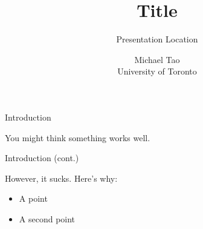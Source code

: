 \documentclass[10pt]{beamer}
\title{Title}
\subtitle{Presentation Location}
\date{}
\author{Michael Tao\\{\scriptsize{University of Toronto}}}
\begin{document}
\maketitle
%
%



\begin{frame}[fragile]{Introduction}

You might think something works well.


\end{frame}



\begin{frame}[fragile]{Introduction (cont.)}

    However, it sucks. Here's why:

\vspace{1ex}
\begin{itemize}
	\item A point
	\item A second point
\end{itemize}

\end{frame}
\end{document}
